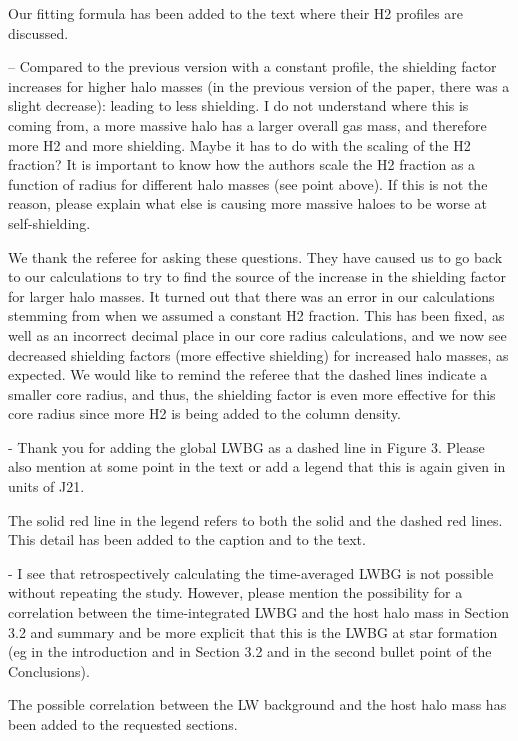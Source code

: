 \documentclass[11pt]{article}
\newenvironment{referee}[1][]{%
    \ignorespaces%
    \begin{mdframed}[style=myquotestyle,#1]%
}{%
    \end{mdframed}%
    \ignorespacesafterend%
}%
\begin{document}
    Our fitting formula has been added to the text where their H2 profiles are discussed.


\begin{referee}
    -- Compared to the previous version with a constant profile, the shielding factor increases for higher halo masses (in the previous version of the paper, there was a slight decrease): leading to less shielding. I do not understand where this is coming from, a more massive halo has a larger overall gas mass, and therefore more H2 and more shielding. Maybe it has to do with the scaling of the H2 fraction?  It is important to know how the authors scale the H2 fraction as a function of radius for different halo masses (see point above). If this is not the reason, please explain what else is causing more massive haloes to be worse at self-shielding.  
\end{referee}
    We thank the referee for asking these questions. They have caused us to go back to our calculations to try to find the source of the increase in the shielding factor for larger halo masses. It turned out that there was an error in our calculations stemming from when we assumed a constant H2 fraction. This has been fixed, as well as an incorrect decimal place in our core radius calculations, and we now see decreased shielding factors (more effective shielding) for increased halo masses, as expected. We would like to remind the referee that the dashed lines indicate a smaller core radius, and thus, the shielding factor is even more effective for this core radius since more H2 is being added to the column density. 

\begin{referee}
    - Thank you for adding the global LWBG as a dashed line in Figure 3. Please also mention at some point in the text or add a legend that this is again given in units of J21. 
\end{referee}
    The solid red line in the legend refers to both the solid and the dashed red lines. This detail has been added to the caption and to the text. 

\begin{referee}
    - I see that retrospectively calculating the time-averaged LWBG is not possible without repeating the study. However, please mention the possibility for a correlation between the time-integrated LWBG and the host halo mass in Section 3.2 and summary and be more explicit that this is the LWBG at star formation (eg in the introduction and in Section 3.2 and in the second bullet point of the Conclusions).  
\end{referee}
    The possible correlation between the LW background and the host halo mass has been added to the requested sections.
\end{document}
